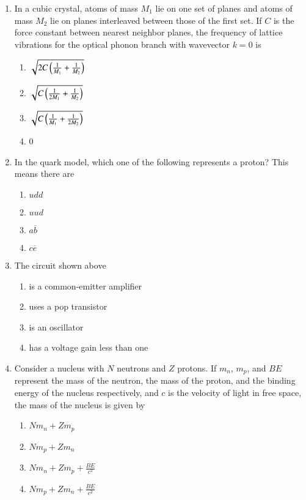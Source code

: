 \documentclass[journal,9pt,onecolumn]{IEEEtran}
\begin{document}
\begin{enumerate}
\item In a cubic crystal, atoms of mass $M_1$ lie on one set of planes and atoms of mass $M_2$ lie on planes interleaved between those of the first set. If $C$ is the force constant between nearest neighbor planes, the frequency of lattice vibrations for the optical phonon branch with wavevector $k = 0$ is

\begin{multicols}{4}
\begin{enumerate}
    \item $\sqrt{2C\left(\frac{1}{M_1}+\frac{1}{M_2}\right)}$
    \item $\sqrt{C\left(\frac{1}{2M_1}+\frac{1}{M_2}\right)}$
    \item $\sqrt{C\left(\frac{1}{M_1}+\frac{1}{2M_2}\right)}$
    \item 0
\end{enumerate}
\end{multicols}


\item  In the quark model, which one of the following represents a proton?
This means there are
\begin{multicols}{4}    
\begin{enumerate}
    \item $udd$
    \item $uud$
    \item $a\overline{b}$
    \item $c\overline{e}$
\end{enumerate}
\end{multicols}

\item     
        
 The circuit shown above
\begin{multicols}{2}    
\begin{enumerate}
    \item is a common-emitter amplifier
    \item uses a pop transistor
    \item is an oscillator
    \item has a voltage gain less than one
\end{enumerate}
\end{multicols}


\item Consider a nucleus with $N$ neutrons and $Z$ protons. If $m_n$, $m_p$, and $BE$ represent the mass of the neutron, the mass of the proton, and the binding energy of the nucleus respectively, and $c$ is the velocity of light in free space, the mass of the nucleus is given by
\begin{multicols}{4}
\begin{enumerate}
    \item $Nm_n + Zm_p$
    \item $Nm_p + Zm_n$
    \item $Nm_n + Zm_p + \frac{BE}{c^2}$
    \item $Nm_p + Zm_n + \frac{BE}{c^2}$
\end{enumerate}
\end{multicols}



\end{enumerate}
\end{document}
